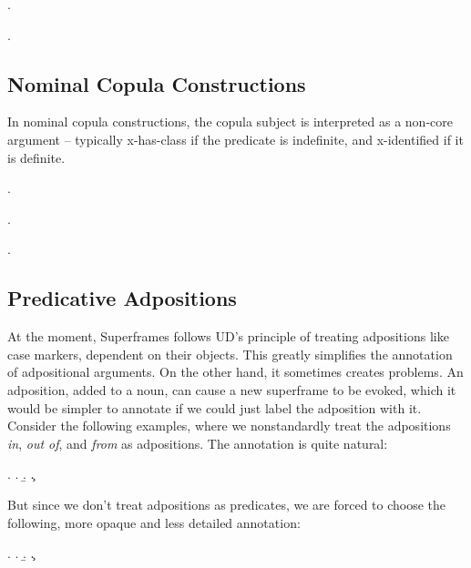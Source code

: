 \documentclass[a4paper]{article}
\newcommand{\rl}[1]{\textsf{#1}}
\begin{document}
\ex.

\ex.


\newpage\subsection{Nominal Copula Constructions}

In nominal copula constructions, the copula subject is interpreted as a
non-core argument -- typically \rl{x-has-class} if the predicate is indefinite,
and \rl{x-identified} if it is definite.

\ex.

\ex.

\ex.


\newpage\subsection{Predicative Adpositions}

At the moment, Superframes follows UD's principle of treating adpositions like
case markers, dependent on their objects. This greatly simplifies the
annotation of adpositional arguments. On the other hand, it sometimes creates
problems. An adposition, added to a noun, can cause a new superframe to be
evoked, which it would be simpler to annotate if we could just label the
adposition with it. Consider the following examples, where we nonstandardly
treat the adpositions \emph{in}, \emph{out of}, and \emph{from} as adpositions.
The annotation is quite natural:

\ex.
\a.
\b.
\c.

But since we don't treat adpositions as predicates, we are forced to choose the following, more opaque and less detailed annotation:

\ex.
\a.\label{ex:berge}
\b.\label{ex:office}
\c.\label{ex:miles}
\end{document}
